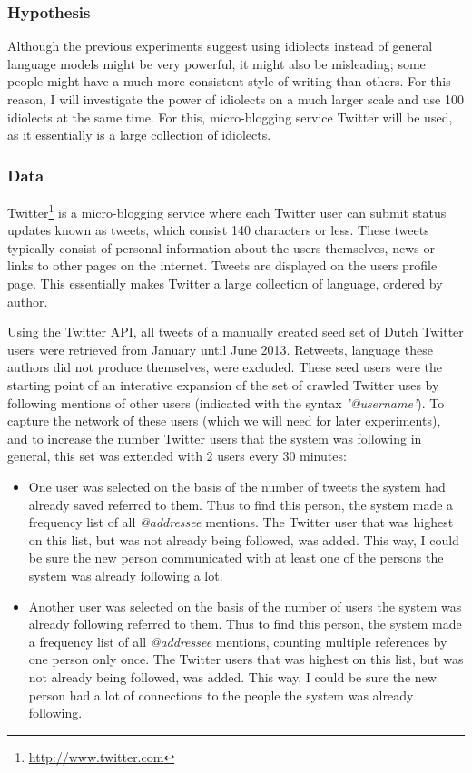 \documentclass[12pt]{article}
\begin{document}
\subsubsection{Hypothesis}
Although the previous experiments suggest using idiolects instead of general language models might be very powerful, it might also be misleading; some people might have a much more consistent style of writing than others. For this reason, I will investigate the power of idiolects on a much larger scale and use 100 idiolects at the same time. For this, micro-blogging service Twitter will be used, as it essentially is a large collection of idiolects.

\subsubsection{Data}
Twitter\footnote{\url{http://www.twitter.com}} is a micro-blogging service where each Twitter user can submit status updates known as tweets, which consist 140 characters or less. These tweets typically consist of personal information about the users themselves, news or links to other pages on the internet. Tweets are displayed on the users profile page. This essentially makes Twitter a large collection of language, ordered by author. 

Using the Twitter API, all tweets of a manually created seed set of Dutch Twitter users were retrieved from January until June 2013. Retweets, language these authors did not produce themselves, were excluded. These seed users were the starting point of an interative expansion of the set of crawled Twitter uses by following mentions of other users (indicated with the syntax \emph{'@username'}). To capture the network of these users (which we will need for later experiments), and to increase the number Twitter users that the system was following in general, this set was extended with 2 users every 30 minutes:

\begin{itemize}
\item One user was selected on the basis of the number of tweets the system had already saved referred to them. Thus to find this person, the system made a frequency list of all \emph{@addressee} mentions. The Twitter user that was highest on this list, but was not already being followed, was added. This way, I could be sure the new person communicated with at least one of the persons the system was already following a lot.
\item Another user was selected on the basis of the number of users the system was already following referred to them. Thus to find this person, the system made a frequency list of all \emph{@addressee} mentions, counting multiple references by one person only once. The Twitter users that was highest on this list, but was not already being followed, was added. This way, I could be sure the new person had a lot of connections to the people the system was already following.
\end{itemize}
\end{document}
